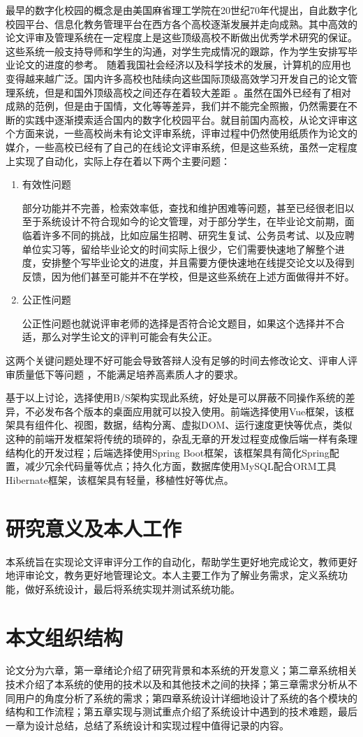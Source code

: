 最早的数字化校园的概念是由美国麻省理工学院在20世纪70年代提出\cite{张磊2020数字校园下高职院校教务管理系统设计}，自此数字化校园平台、信息化教务管理平台在西方各个高校逐渐发展并走向成熟。其中高效的论文评审及管理系统在一定程度上是这些顶级高校不断做出优秀学术研究的保证。这些系统一般支持导师和学生的沟通，对学生完成情况的跟踪，作为学生安排写毕业论文的进度的参考。
随着我国社会经济以及科学技术的发展，计算机的应用也变得越来越广泛\cite{.2020h}。国内许多高校也陆续向这些国际顶级高效学习开发自己的论文管理系统，但是和国外顶级高校之间还存在着较大差距 \cite{.2017e}。虽然在国外已经有了相对成熟的范例，但是由于国情，文化等等差异，我们并不能完全照搬，仍然需要在不断的实践中逐渐摸索适合国内的数字化校园平台。就目前国内高校，从论文评审这个方面来说，一些高校尚未有论文评审系统，评审过程中仍然使用纸质作为论文的媒介，一些高校已经有了自己的在线论文评审系统，但是这些系统，虽然一定程度上实现了自动化，实际上存在着以下两个主要问题：
\begin{enumerate}
	\item 有效性问题\cite{.2019d}

	      部分功能并不完善，检索效率低，查找和维护困难等问题，甚至已经很老旧以至于系统设计不符合现如今的论文管理，对于部分学生，在毕业论文前期，面临着许多不同的挑战，比如应届生招聘、研究生复试、公务员考试、以及应聘单位实习等，留给毕业论文的时间实际上很少\cite{.2019c}，它们需要快速地了解整个进度，安排整个写毕业论文的进度，并且需要方便快速地在线提交论文以及得到反馈，因为他们甚至可能并不在学校，但是这些系统在上述方面做得并不好。

	\item 公正性问题\cite{.2019d}

	      公正性问题也就说评审老师的选择是否符合论文题目，如果这个选择并不合适，那么对学生论文的评判可能会有失公正\cite{Setiyani.2020}。
\end{enumerate}

这两个关键问题处理不好可能会导致答辩人没有足够的时间去修改论文、评审人评审质量低下等问题 ，不能满足培养高素质人才的要求\cite{.2019d}。

基于以上讨论，选择使用B/S架构实现此系统，好处是可以屏蔽不同操作系统的差异，不必发布各个版本的桌面应用就可以投入使用。前端选择使用Vue框架，该框架具有组件化、视图，数据，结构分离、虚拟DOM、运行速度更快等优点，类似这种的前端开发框架将传统的琐碎的，杂乱无章的开发过程变成像后端一样有条理结构化的开发过程；后端选择使用Spring Boot框架，该框架具有简化Spring配置，减少冗余代码量等优点；持久化方面，数据库使用MySQL配合ORM工具Hibernate框架，该框架具有轻量，移植性好等优点。

\section{研究意义及本人工作}

本系统旨在实现论文评审评分工作的自动化，帮助学生更好地完成论文，教师更好地评审论文，教务更好地管理论文。本人主要工作为了解业务需求，定义系统功能，做好系统设计，最后将系统实现并测试系统功能。

\section{本文组织结构}

论文分为六章，第一章绪论介绍了研究背景和本系统的开发意义；第二章系统相关技术介绍了本系统的使用的技术以及和其他技术之间的抉择；第三章需求分析从不同用户的角度分析了系统的需求；第四章系统设计详细地设计了系统的各个模块的结构和工作流程；第五章实现与测试重点介绍了系统设计中遇到的技术难题，最后一章为设计总结，总结了系统设计和实现过程中值得记录的内容。
